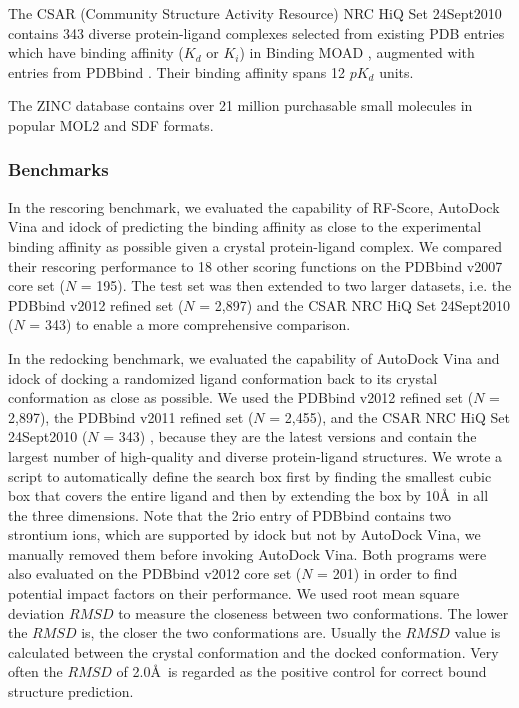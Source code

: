 The CSAR (Community Structure Activity Resource) NRC HiQ Set 24Sept2010 contains 343 diverse protein-ligand complexes selected from existing PDB \citep{540,537} entries which have binding affinity ($K_d$ or $K_i$) in Binding MOAD \citep{517,518}, augmented with entries from PDBbind \citep{529,530}. Their binding affinity spans 12 $pK_d$ units.

The ZINC database contains over 21 million purchasable small molecules in popular MOL2 and SDF formats.

\subsubsection{Benchmarks}

In the rescoring benchmark, we evaluated the capability of RF-Score, AutoDock Vina and idock of predicting the binding affinity as close to the experimental binding affinity as possible given a crystal protein-ligand complex. We compared their rescoring performance to 18 other scoring functions on the PDBbind v2007 core set ($N$ = 195). The test set was then extended to two larger datasets, i.e. the PDBbind v2012 \citep{529,530} refined set ($N$ = 2,897) and the CSAR NRC HiQ Set 24Sept2010 ($N$ = 343) \citep{857,960} to enable a more comprehensive comparison.

In the redocking benchmark, we evaluated the capability of AutoDock Vina and idock of docking a randomized ligand conformation back to its crystal conformation as close as possible. We used the PDBbind v2012 \citep{529,530} refined set ($N$ = 2,897), the PDBbind v2011 refined set ($N$ = 2,455), and the CSAR NRC HiQ Set 24Sept2010 ($N$ = 343) \citep{857,960}, because they are the latest versions and contain the largest number of high-quality and diverse protein-ligand structures. We wrote a script to automatically define the search box first by finding the smallest cubic box that covers the entire ligand and then by extending the box by 10\AA\ in all the three dimensions. Note that the 2rio entry of PDBbind contains two strontium ions, which are supported by idock but not by AutoDock Vina, we manually removed them before invoking AutoDock Vina. Both programs were also evaluated on the PDBbind v2012 core set ($N$ = 201) in order to find potential impact factors on their performance. We used root mean square deviation $RMSD$ to measure the closeness between two conformations. The lower the $RMSD$ is, the closer the two conformations are. Usually the $RMSD$ value is calculated between the crystal conformation and the docked conformation. Very often the $RMSD$ of 2.0\AA\ is regarded as the positive control for correct bound structure prediction. 

